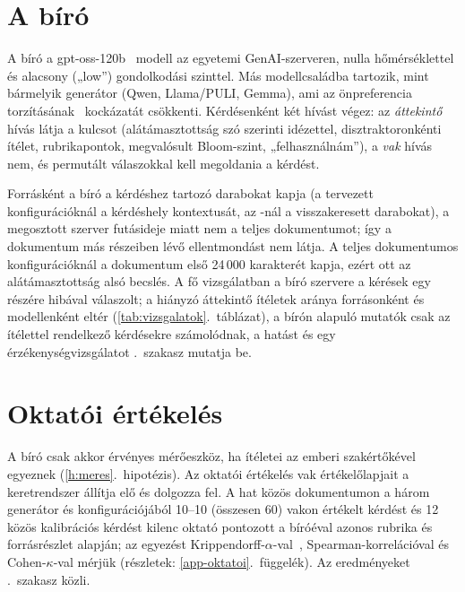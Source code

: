 \section{A bíró}
\label{sec:biro}

A bíró a gpt-oss-120b~\cite{gptoss2025} modell az egyetemi GenAI-szerveren, nulla hőmérséklettel és
alacsony („low”) gondolkodási szinttel. Más modellcsaládba tartozik, mint bármelyik generátor (Qwen,
Llama/PULI, Gemma), ami az önpreferencia torzításának~\cite{panickssery2024selfpref} kockázatát
csökkenti. Kérdésenként két hívást végez: az \emph{áttekintő} hívás látja a kulcsot (alátámasztottság szó
szerinti idézettel, disztraktoronkénti ítélet, rubrikapontok, megvalósult Bloom-szint, „felhasználnám”), a
\emph{vak} hívás nem, és permutált válaszokkal kell megoldania a kérdést.

Forrásként a bíró a kérdéshez tartozó darabokat kapja (a tervezett konfigurációknál a kérdéshely
kontextusát, az -nál a visszakeresett darabokat), a megosztott szerver futásideje miatt nem a
teljes dokumentumot; így a dokumentum más részeiben lévő ellentmondást nem látja. A teljes dokumentumos
konfigurációknál a dokumentum első 24\,000 karakterét kapja, ezért ott az alátámasztottság alsó becslés. A
fő vizsgálatban a bíró szervere a kérések egy részére hibával válaszolt; a hiányzó áttekintő ítéletek
aránya forrásonként és modellenként eltér (\ref{tab:vizsgalatok}.~táblázat), a bírón alapuló mutatók csak
az ítélettel rendelkező kérdésekre számolódnak, a hatást és egy érzékenységvizsgálatot
\az{\ref{sec:fo-meres}}.~szakasz mutatja be.

\section{Oktatói értékelés}
\label{sec:oktatoi}

A bíró csak akkor érvényes mérőeszköz, ha ítéletei az emberi szakértőkével egyeznek
(\ref{h:meres}.~hipotézis). Az oktatói értékelés vak értékelőlapjait a keretrendszer állítja elő és dolgozza fel. A hat közös dokumentumon a három generátor  és 
konfigurációjából 10--10 (összesen 60) vakon értékelt kérdést és 12 közös kalibrációs kérdést kilenc oktató pontozott a
bíróéval azonos rubrika és forrásrészlet alapján; az egyezést
Krippendorff-$\alpha$-val~\cite{krippendorff2004}, Spearman-korrelációval és Cohen-$\kappa$-val mérjük
(részletek: \ref{app-oktatoi}.~függelék). Az eredményeket \az{\ref{sec:oktatoi-eredmeny}}.~szakasz közli.

